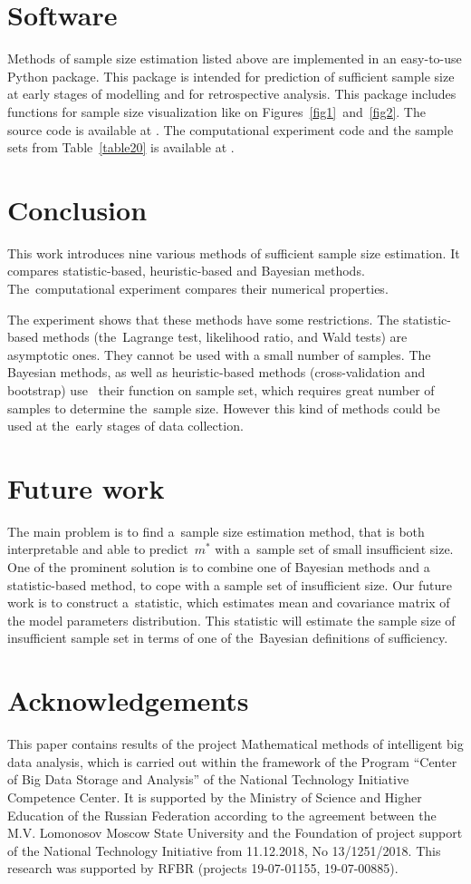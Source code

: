 \documentclass[
11pt,%
tightenlines,%
twoside,%
onecolumn,%
nofloats,%
nobibnotes,%
nofootinbib,%
superscriptaddress,%
noshowpacs,%
centertags]%
{revtex4}
\begin{document}
\section{Software}
Methods of sample size estimation listed above are implemented  in
an easy-to-use Python package. This package is intended for
prediction of sufficient sample size at early stages of modelling
and for retrospective analysis. This package includes functions for
sample size visualization like on Figures~\ref{fig1}~and~\ref{fig2}.
The source code is available at
\mbox{}. The
computational experiment code and the sample sets from
Table~\ref{table20} is available at
\mbox{}.

\section{Conclusion}
This work introduces nine various methods of sufficient sample size
estimation.  It compares statistic-based, heuristic-based and
Bayesian methods. The~computational experiment compares their
numerical properties.

The  experiment shows that  these methods have some restrictions.
The statistic-based methods (the~Lagrange test, likelihood ratio,
and Wald tests) are asymptotic ones. They cannot be used with a
small number of samples. The Bayesian methods, as well as
heuristic-based methods (cross-validation and bootstrap) use~ their
function on sample set, which requires great number of samples to
determine the~sample size. However this kind of methods could be
used at the~early stages of data collection.

\section{Future work}
The main problem is to find a~sample size estimation method,  that
is both interpretable and able to predict~$m^*$ with a~sample set of
small insufficient size. One of the prominent solution is to combine
one of Bayesian methods  and a statistic-based method, to cope with
a sample set of insufficient size.  Our future work is to construct
a~statistic, which estimates mean and covariance matrix of the model
parameters distribution. This statistic will estimate the sample
size of insufficient sample set in terms of one of the~Bayesian
definitions of sufficiency.

\section*{Acknowledgements}
This paper contains results of the project Mathematical methods of
intelligent big data analysis, which is carried out within the
framework of the Program ``Center of Big Data Storage and Analysis''
of the National Technology Initiative Competence Center. It is
supported by the Ministry of Science and Higher Education of the
Russian Federation according to the agreement between the M.V.
Lomonosov Moscow State University and the Foundation of project
support of the National Technology Initiative from 11.12.2018, No
13/1251/2018. This research was supported by RFBR (projects
19-07-01155, 19-07-00885).
\end{document}
